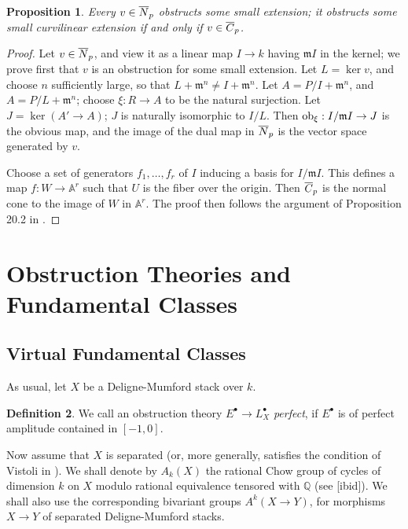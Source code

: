 \documentclass[11pt]{article}
\theoremstyle{plain}
\newtheorem{prop}{Proposition}[section]
\theoremstyle{definition}
\newtheorem{defnp}[prop]{Definition}
\newenvironment{defn}{\begin{defnp}\normalfont}{\end{defnp}}
\newenvironment{pf}{\begin{proof}}{\end{proof}}
\newcommand{\com}{^{\scriptscriptstyle\bullet}}
\newcommand{\Mm}{{\mathfrak{m}}}
\newcommand{\aaa}{{\mathbb{A}}}
\newcommand{\qq}{{\mathbb{Q}}}
\newcommand{\ob}{\mathop{\rm ob}}
\theoremstyle{plain}
\theoremstyle{definition}
\theoremstyle{remark}
\begin{document}
\begin{prop}
Every \(v\in \overline{ N}_p\) obstructs
some small extension; it obstructs some small curvilinear extension
if and only if
\(v\in\overline{ C}_p\).
\end{prop}
\begin{pf}
Let \(v\in \overline{ N}_p\), and view it as a linear map \(I\to k\) having \(\Mm I\) in the
kernel; we prove first that \(v\) is an obstruction for some small extension. Let
\(L=\ker v\), and choose \(n\) sufficiently large, so that \(L+\Mm^n\ne I+\Mm^n\).
Let
\(A=P/I+\Mm^n\), and \(A=P/L+\Mm^n\); choose \(\xi:R\to A\) to be the natural
surjection. Let \(J=\ker (A'\to A)\); \(J\) is naturally isomorphic to \(I/L\). Then
\(\ob_\xi:I/\Mm I\to J\) is the obvious map, and the image of the dual map in
\(\overline{ N}_p\) is the vector space generated by \(v\).

Choose a set of generators \(f_1,\ldots,f_r\) of
\(I\) inducing a basis for \(I/\Mm I\). This defines a map \(f:W\to \aaa^r\) such
that
\(U\) is the fiber over the origin. Then \(\overline{ C}_p\) is the normal cone to the image of
\(W\) in \(\aaa^r\). The proof then follows the argument of Proposition 20.2 in
\cite{harris}.
\end{pf}






\section{Obstruction Theories and Fundamental Classes} \label{otafc}



\subsection{Virtual Fundamental Classes}

As usual, let \(X\) be a Deligne-Mumford stack over  \(k\).

\begin{defn} We call an obstruction theory \(E\com\rightarrow L_X\com\) {\em
perfect}, if \(E\com\) is of perfect amplitude contained in \([-1,0]\).
\end{defn}


Now assume that \(X\) is separated (or, more generally, satisfies the condition
of
Vistoli in
\cite{vistoli}). We shall denote by \(A_k(X)\) the rational Chow group of cycles
of dimension \(k\) on
\(X\) modulo rational equivalence tensored with \(\qq\) (see [ibid]). We shall also
use the corresponding bivariant groups \(A^k(X\rightarrow Y)\), for morphisms
\(X\rightarrow Y\) of separated Deligne-Mumford stacks.
\end{document}
